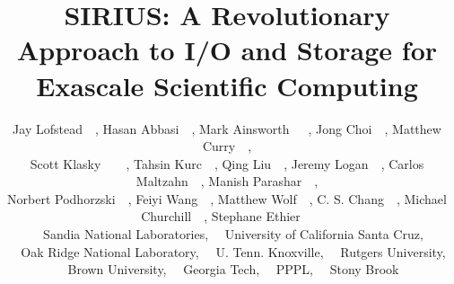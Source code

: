 \documentclass[letterpaper,twocolumn,10pt]{article}
\begin{document}
\date{}

\title{\Large \bf SIRIUS: A Revolutionary Approach to I/O and Storage for Exascale Scientific Computing}

\author{
Jay Lofstead\footnotemark[1]~~,
Hasan Abbasi\footnotemark[3]~~,
Mark Ainsworth\footnotemark[6]~\footnotemark[3]~~,
Jong Choi\footnotemark[3]~~,
Matthew Curry\footnotemark[1]~~,\\
Scott Klasky\footnotemark[3]~\footnotemark[4]~\footnotemark[7]~~,
Tahsin Kurc\footnotemark[9]~~,
Qing Liu\footnotemark[3]~~,
Jeremy Logan\footnotemark[4]~~,
Carlos Maltzahn\footnotemark[2]~~,
Manish Parashar\footnotemark[5]~~,\\
Norbert Podhorzski\footnotemark[3]~~,
Feiyi Wang\footnotemark[3]~~,
Matthew Wolf\footnotemark[7]~~,
C. S. Chang\footnotemark[8]~~,
Michael Churchill\footnotemark[8]~~,
Stephane Ethier\footnotemark[8]~~
\\
\footnotemark[1]~~Sandia National Laboratories,
\footnotemark[2]~~University of California Santa Cruz,\\
\footnotemark[3]~~Oak Ridge National Laboratory,
\footnotemark[4]~~U. Tenn. Knoxville,
\footnotemark[5]~~Rutgers University,\\
\footnotemark[6]~~Brown University,
\footnotemark[7]~~Georgia Tech,
\footnotemark[8]~~PPPL,
\footnotemark[9]~~Stony Brook
}


\maketitle
\end{document}

